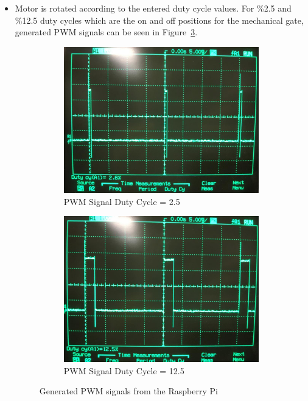 \begin{itemize}
\item Motor is rotated according to the entered duty cycle values. For \%2.5 and \%12.5 duty cycles which are the on and off positions for the mechanical gate, generated PWM signals can be seen in Figure~\ref{fig:pwmaaa}.
\begin{figure}[ht]
     \centering
     \begin{subfigure}[b]{0.49\textwidth}
     \includegraphics[width=\linewidth]{img/pwm25.jpeg}
     \caption{PWM Signal Duty Cycle = 2.5}
     \label{fig:pwm25}
     \end{subfigure}
     \begin{subfigure}[b]{0.49\textwidth}
     \includegraphics[width=\linewidth]{img/pwm125.jpeg}
     \caption {PWM Signal Duty Cycle = 12.5}
     \label{fig:pwm125}
     \end{subfigure}        
     \caption{Generated PWM signals from the Raspberry Pi}
     \label{fig:pwmaaa}
\end{figure}


\end{itemize}
